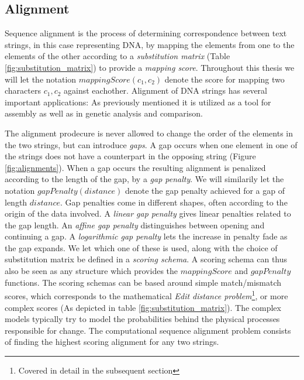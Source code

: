 \documentclass[thesis.tex]{subfiles}
\begin{document}
\subsection{Alignment}
\label{sec:alignment}
Sequence alignment is the process of determining correspondence between text strings, in this case representing DNA, by mapping the elements from one to the elements of the other according to a \textit{substitution matrix} (Table \ref{fig:substitution_matrix}) to provide a \textit{mapping score}. Throughout this thesis we will let the notation $mappingScore(c_1,c_2)$ denote the score for mapping two characters $c_1, c_2$ against eachother. Alignment of DNA strings has several important applications: As previously mentioned it is utilized as a tool for assembly as well as in genetic analysis and comparison.\\
\par\noindent
The alignment prodecure is never allowed to change the order of the elements in the two strings, but can introduce \textit{gaps}. A gap occurs when one element in one of the strings does not have a counterpart in the opposing string (Figure \ref{fig:alignments}). When a gap occurs the resulting alignment is penalized according to the length of the gap, by a \textit{gap penalty}. We will similarily let the notation $gapPenalty(distance)$ denote the gap penalty achieved for a gap of length $distance$. Gap penalties come in different shapes, often according to the origin of the data involved. A \textit{linear gap penalty} gives linear penalties related to the gap length. An \textit{affine gap penalty} distinguishes between opening and continuing a gap. A \textit{logarithmic gap penalty} lets the increase in penalty fade as the gap expands. We let which one of these is used, along with the choice of substitution matrix be defined in a \textit{scoring schema}. A scoring schema can thus also be seen as any structure which provides the $mappingScore$ and $gapPenalty$ functions. The scoring schemas can be based around simple match/mismatch scores, which corresponds to the mathematical \textit{Edit distance problem}\footnote{Covered in detail in the subsequent section}, or more complex scores (As depicted in table \ref{fig:substitution_matrix}). The complex models typically try to model the probabilities behind the physical processes responsible for change. The computational sequence alignment problem consists of finding the highest scoring alignment for any two strings.\\
\par\noindent
\end{document}
